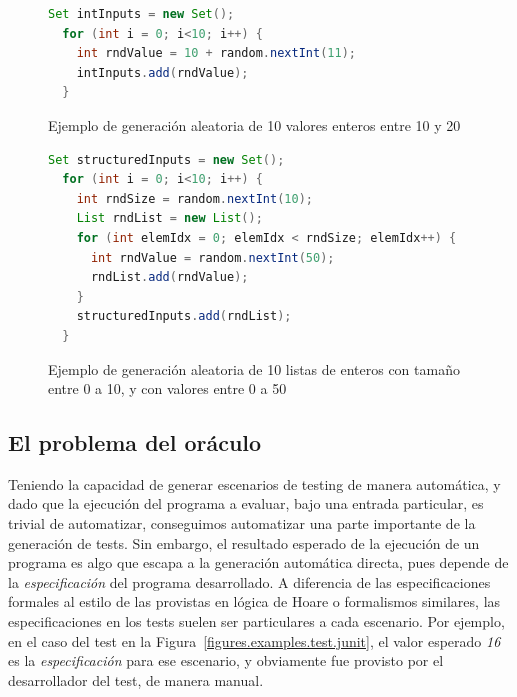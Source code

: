 \begin{figure}
	\small
	\begin{lstlisting}[frame=single, mathescape=true,language=Java,basicstyle={},xleftmargin=.04\textwidth,xrightmargin=.04\textwidth]
  Set intInputs = new Set();
  for (int i = 0; i<10; i++) {
    int rndValue = 10 + random.nextInt(11);
    intInputs.add(rndValue);
  }
	\end{lstlisting}
	\caption{Ejemplo de generaci\'on aleatoria de 10 valores enteros entre 10 y 20}
	\label{figures.examples.testing.random.primitive}
\end{figure}

\begin{figure}
	\small
	\begin{lstlisting}[frame=single, mathescape=true,language=Java,basicstyle={},xleftmargin=.04\textwidth,xrightmargin=.04\textwidth]
  Set structuredInputs = new Set();
  for (int i = 0; i<10; i++) {
    int rndSize = random.nextInt(10);
    List rndList = new List();
    for (int elemIdx = 0; elemIdx < rndSize; elemIdx++) {
      int rndValue = random.nextInt(50);
      rndList.add(rndValue);
    }
    structuredInputs.add(rndList);
  }
	\end{lstlisting}
	\caption{Ejemplo de generaci\'on aleatoria de 10 listas de enteros con tama\~no entre 0 a 10, y con valores entre 0 a 50}
	\label{figures.examples.testing.random.structure}
\end{figure}


\subsection{El problema del or\'aculo}

Teniendo la capacidad de generar escenarios de testing de manera autom\'atica, y dado que la ejecuci\'on del programa a evaluar, bajo una entrada particular, es trivial de automatizar, conseguimos automatizar una parte importante de la generaci\'on de tests. Sin embargo, el resultado esperado de la ejecuci\'on de un programa es algo que escapa a la generaci\'on autom\'atica directa, pues depende de la \emph{especificaci\'on} del programa desarrollado. A diferencia de las especificaciones formales al estilo de las provistas en l\'ogica de Hoare o formalismos similares, las especificaciones en los tests suelen ser particulares a cada escenario. Por ejemplo, en el caso del test en la Figura~\ref{figures.examples.test.junit}, el valor esperado \emph{16} es la \emph{especificaci\'on} para ese escenario, y obviamente fue provisto por el desarrollador del test, de manera manual. 

